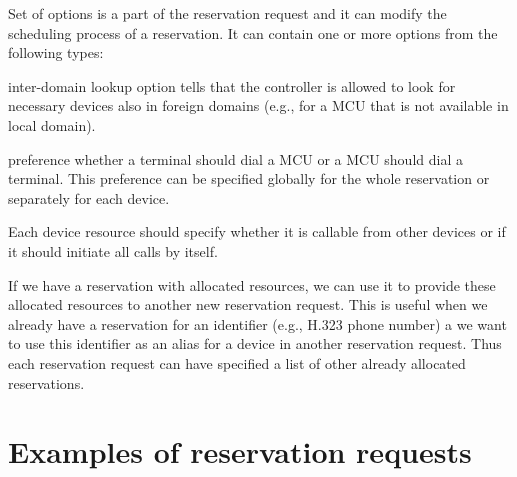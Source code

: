 Set of options is a part of the reservation request and it can modify the scheduling process of a reservation. It can contain one or more options from the following types:
\begin{compactitem}
\item inter-domain lookup option tells that the controller is allowed to look for necessary devices also in foreign domains (e.g., for a MCU that is not available in local domain).
\item preference whether a terminal should dial a MCU or a MCU should dial a terminal. This preference can be specified globally for the whole reservation or separately for each device.
\end{compactitem}
Each device resource should specify whether it is callable from other devices or if it should initiate all calls by itself.

If we have a reservation with allocated resources, we can use it to provide these allocated resources to another new reservation request. This is useful
when we already have a reservation for an identifier (e.g., H.323 phone number) a we want to use this identifier as an alias for a device in another reservation request. Thus each reservation request can have specified a list of other already allocated reservations.


\section{Examples of reservation requests}

\CodeStyle{}
\CodeStyleAppendImplementation
\CodeStyleAppendEnum

